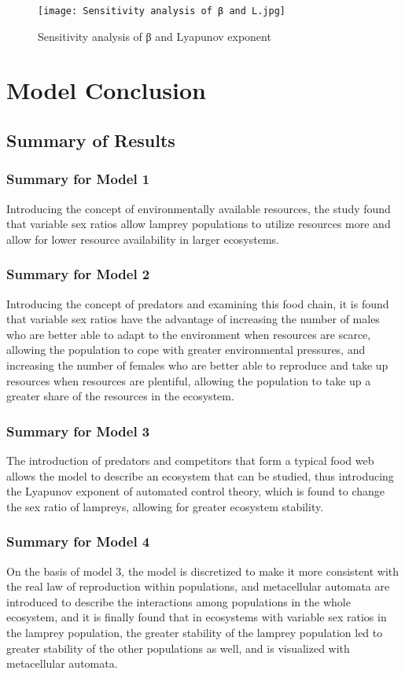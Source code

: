 \documentclass[12pt]{article}  %
\begin{document}
\begin{figure}[htbp]
	\centering
	{\texttt{[image: Sensitivity analysis of β and L.jpg]}\label{Sensitivity analysis of β and L}}
	\caption{Sensitivity analysis of β and  Lyapunov exponent}
	\label{fig:AM5}
\end{figure}

\section{Model Conclusion }

\subsection{Summary of Results}
\subsubsection{Summary for Model 1}
Introducing the concept of environmentally available resources, the study found that variable sex ratios allow lamprey populations to utilize resources more and allow for lower resource availability in larger ecosystems.
\subsubsection{Summary for Model 2}
Introducing the concept of predators and examining this food chain, it is found that variable sex ratios have the advantage of increasing the number of males who are better able to adapt to the environment when resources are scarce, allowing the population to cope with greater environmental pressures, and increasing the number of females who are better able to reproduce and take up resources when resources are plentiful, allowing the population to take up a greater share of the resources in the ecosystem.
\subsubsection{Summary for Model 3}
The introduction of predators and competitors that form a typical food web allows the model to describe an ecosystem that can be studied, thus introducing the Lyapunov exponent of automated control theory, which is found to change the sex ratio of lampreys, allowing for greater ecosystem stability.
\subsubsection{Summary for Model 4}
On the basis of model 3, the model is discretized to make it more consistent with the real law of reproduction within populations, and metacellular automata are introduced to describe the interactions among populations in the whole ecosystem, and it is finally found that in ecosystems with variable sex ratios in the lamprey population, the greater stability of the lamprey population led to greater stability of the other populations as well, and is visualized with metacellular automata.
\end{document}

